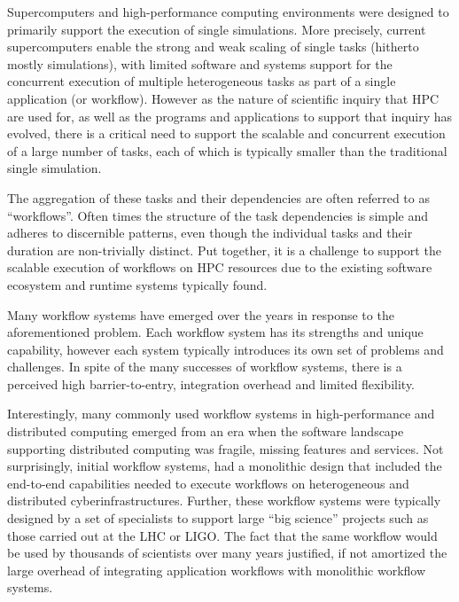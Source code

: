 

Supercomputers and high-performance computing environments were designed to
primarily support the execution of single simulations. More precisely, current
supercomputers enable the strong and weak scaling of single tasks (hitherto
mostly simulations), with limited software and systems support for the
concurrent execution of multiple heterogeneous tasks as part of a single
application (or workflow). However as the nature of scientific inquiry that
HPC are used for, as well as the programs and applications to support that
inquiry has evolved, there is a critical need to support the scalable and
concurrent execution of a large number of tasks, each of which is typically
smaller than the traditional single simulation.

The aggregation of these tasks and their dependencies are often referred to as
``workflows''. Often times the structure of the task dependencies is simple and
adheres to discernible patterns, even though the individual tasks and their
duration are non-trivially distinct. Put together, it is a challenge to
support the scalable execution of workflows on HPC resources due to the
existing software ecosystem and runtime systems typically found.

Many workflow systems have emerged over the years in response to the
aforementioned problem. Each workflow system has its strengths and unique
capability, however each system typically introduces its own set of problems
and challenges. In spite of the many successes of workflow systems, there is a
perceived high barrier-to-entry, integration overhead and limited flexibility.

Interestingly, many commonly used workflow systems in high-performance and
distributed computing emerged from an era when the software landscape
supporting distributed computing was fragile, missing features and services.
Not surprisingly, initial workflow systems, had a monolithic design that
included the end-to-end capabilities needed to execute workflows on
heterogeneous and distributed cyberinfrastructures. Further, these workflow
systems were typically designed by a set of specialists to support large ``big
science'' projects such as those carried out at the LHC or LIGO. The fact that
the same workflow would be used by thousands of scientists over many years
justified, if not amortized the large overhead of integrating application
workflows with monolithic workflow systems.

